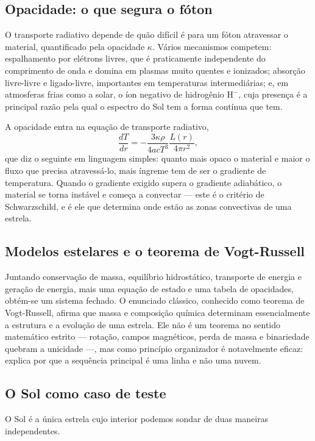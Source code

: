 \documentclass[11pt,a4paper]{article}
\begin{document}
\subsection*{Opacidade: o que segura o fóton}

O transporte radiativo depende de quão difícil é para um fóton atravessar o material, quantificado pela opacidade $\kappa$. Vários mecanismos competem: espalhamento por elétrons livres, que é praticamente independente do comprimento de onda e domina em plasmas muito quentes e ionizados; absorção livre-livre e ligado-livre, importantes em temperaturas intermediárias; e, em atmosferas frias como a solar, o íon negativo de hidrogênio $\mathrm{H^-}$, cuja presença é a principal razão pela qual o espectro do Sol tem a forma contínua que tem.

A opacidade entra na equação de transporte radiativo,
\[
\frac{dT}{dr}=-\frac{3\kappa\rho}{4ac T^{3}}\frac{L(r)}{4\pi r^{2}},
\]
que diz o seguinte em linguagem simples: quanto mais opaco o material e maior o fluxo que precisa atravessá-lo, mais íngreme tem de ser o gradiente de temperatura. Quando o gradiente exigido supera o gradiente adiabático, o material se torna instável e começa a convectar --- este é o critério de Schwarzschild, e é ele que determina onde estão as zonas convectivas de uma estrela.

\subsection*{Modelos estelares e o teorema de Vogt-Russell}

Juntando conservação de massa, equilíbrio hidrostático, transporte de energia e geração de energia, mais uma equação de estado e uma tabela de opacidades, obtém-se um sistema fechado. O enunciado clássico, conhecido como teorema de Vogt-Russell, afirma que massa e composição química determinam essencialmente a estrutura e a evolução de uma estrela. Ele não é um teorema no sentido matemático estrito --- rotação, campos magnéticos, perda de massa e binariedade quebram a unicidade ---, mas como princípio organizador é notavelmente eficaz: explica por que a sequência principal é uma linha e não uma nuvem.

\subsection*{O Sol como caso de teste}

O Sol é a única estrela cujo interior podemos sondar de duas maneiras independentes.
\end{document}
